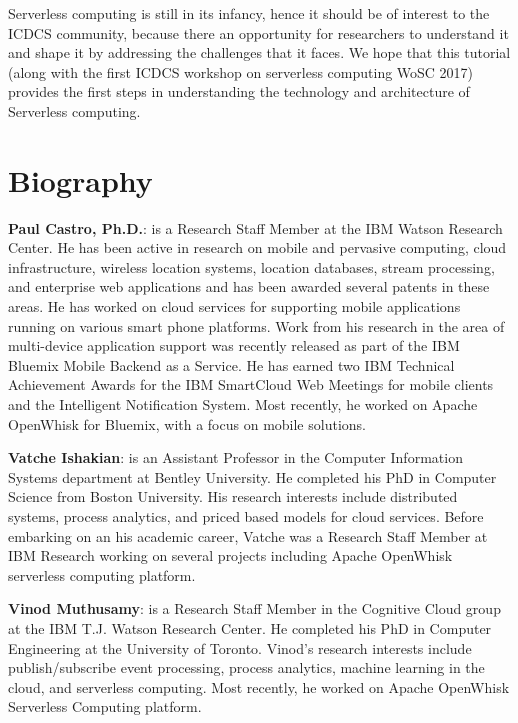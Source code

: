 \documentclass[conference]{IEEEtran}
\begin{document}
Serverless computing is still in its infancy, hence it should be of interest to the ICDCS community, because there an opportunity for researchers to understand it and shape it by addressing the challenges that it faces. We hope that this tutorial (along with the first ICDCS workshop on serverless computing WoSC 2017) provides the first steps in understanding the technology and architecture of Serverless computing.






\section{Biography}
{\noindent \bf Paul Castro, Ph.D.}: is a Research Staff Member at the IBM Watson Research Center. He has been active in research on mobile and pervasive computing, cloud infrastructure, wireless location systems, location databases, stream processing, and enterprise web applications and has been awarded several patents in these areas. He has worked on cloud services for supporting mobile applications running on various smart phone platforms. Work from his research in the area of multi-device application support was recently released as part of the IBM Bluemix Mobile Backend as a Service. He has earned two IBM Technical Achievement Awards for the IBM SmartCloud Web Meetings for mobile clients and the Intelligent Notification System. Most recently, he worked on Apache OpenWhisk for Bluemix, with a focus on mobile solutions.

\smallbreak

{\noindent \bf Vatche Ishakian}: is an Assistant Professor in the Computer Information Systems department at Bentley University. He completed his PhD in Computer Science from Boston University. His research interests include distributed systems, process analytics, and priced based models for cloud services. Before embarking on an his academic career, Vatche was a Research Staff Member at IBM Research working on several projects including Apache OpenWhisk serverless computing platform.

\smallbreak

{\noindent \bf Vinod Muthusamy}: is a Research Staff Member in the Cognitive Cloud group at the IBM T.J. Watson Research Center. He completed his PhD in Computer Engineering at the University of Toronto. Vinod's research interests include publish/subscribe event processing, process analytics, machine learning in the cloud, and serverless computing. Most recently, he worked on Apache OpenWhisk Serverless Computing platform.
\end{document}
